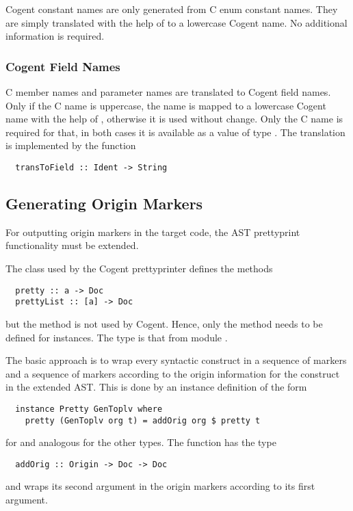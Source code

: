 Cogent constant names are only generated from C enum constant names. They are simply translated
with the help of  to a lowercase Cogent name. No additional information is required.

\subsubsection{Cogent Field Names}

C member names and parameter names are translated to Cogent field names. Only if the C name is
uppercase, the name is mapped to a lowercase Cogent name with the help of , 
otherwise it is used without change. Only the C name is required for that, in both cases it is
available as a value of type . The translation is implemented by the function
\begin{verbatim}
  transToField :: Ident -> String
\end{verbatim}

\subsection{Generating Origin Markers}
\label{impl-ccode-origin}

For outputting origin markers in the target code, the AST prettyprint functionality must be extended.

The class  used by the Cogent prettyprinter defines the methods
\begin{verbatim}
  pretty :: a -> Doc
  prettyList :: [a] -> Doc
\end{verbatim}
but the method  is not used by Cogent. Hence, only the method  needs to be defined
for instances. The type  is that from module .

The basic approach is to wrap every syntactic construct in a sequence of  markers and 
a sequence of  markers according to the origin information for the construct in the extended AST. 
This is done by an instance definition of the form
\begin{verbatim}
  instance Pretty GenToplv where
    pretty (GenToplv org t) = addOrig org $ pretty t
\end{verbatim}
for  and analogous for the other types. The function  has the type
\begin{verbatim}
  addOrig :: Origin -> Doc -> Doc
\end{verbatim}
and wraps its second argument in the origin markers according to its first argument.

